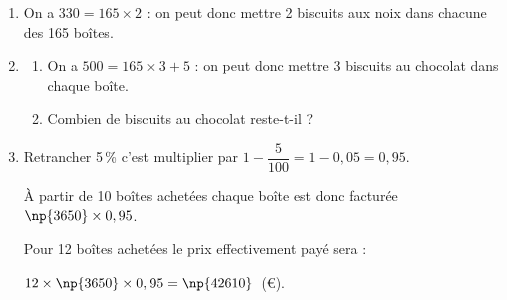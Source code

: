 \begin{enumerate}[resume]
\item %
On a $330 = 165 \times 2$ : on peut donc mettre 2 biscuits aux noix dans chacune des 165 boîtes.

\item
	\begin{enumerate}
		\item %
		On a $500 = 165 \times 3 + 5$ : on peut donc mettre 3 biscuits au chocolat dans chaque boîte.
		\item Combien de biscuits au chocolat reste-t-il ?
	\end{enumerate}
		

\item %

Retrancher 5\,\% c'est multiplier par $1 - \dfrac{5}{100} = 1 - 0,05 = 0,95$.

À partir de 10 boîtes achetées chaque boîte est donc facturée $\np{3650} \times 0,95$.

Pour 12 boîtes achetées le prix effectivement payé sera :

$12 \times \np{3650} \times 0,95 = \np{42610}$~(\euro).

\end{enumerate}

\bigskip

